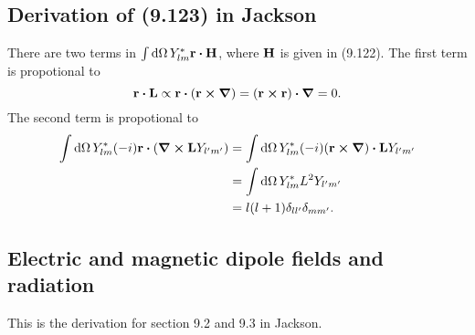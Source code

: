 \documentclass[10pt]{article}
\begin{document}
\subsection{Derivation of (9.123) in Jackson}
There are two terms in $\int \dd{\Omega} Y_{lm}^* \vb{r} \vdot \vb{H}$, where $\vb{H}$ is given in (9.122). The first term is propotional to
\begin{equation}
	\vb{r} \vdot \vb{L} \propto \vb{r} \vdot (\vb{r} \cross \grad) = (\vb{r} \cross \vb{r}) \vdot \grad = 0.
\end{equation}
The second term is propotional to
\begin{align*}
	\int\dd{\Omega} Y_{lm}^* (-i) \vb{r} \vdot (\grad \cross \vb{L} Y_{l'm'}) &=  \int\dd{\Omega} Y_{lm}^* (-i) (\vb{r} \cross \grad) \vdot \vb{L} Y_{l'm'} \\
	&= \int\dd{\Omega} Y_{lm}^* L^2 Y_{l'm'} \\
	&= l(l+1) \delta_{ll'} \delta_{mm'}.
\end{align*}

\subsection{Electric and magnetic dipole fields and radiation}
This is the derivation for section 9.2 and 9.3 in Jackson.
\end{document}
